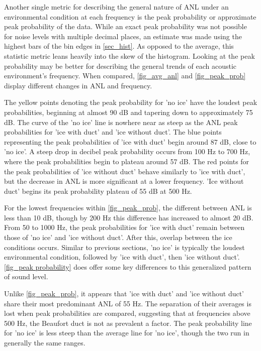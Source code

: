 Another single metric for describing the general nature of ANL under an environmental condition at each frequency is the peak probability or approximate peak probability of the data. While an exact peak probability was not possible for noise levels with multiple decimal places, an estimate was made using the highest bars of the bin edges in \autoref{sec_hist}. As opposed to the average, this statistic metric leans heavily into the skew of the histogram. Looking at the peak probability may be better for describing the general trends of each acoustic environment's frequency. When compared, \autoref{fig_avg_anl} and \autoref{fig_peak_prob} display different changes in ANL and frequency. 

The yellow points denoting the peak probability for 'no ice' have the loudest peak probabilities, beginning at almost 90 dB and tapering down to approximately 75 dB. The curve of the 'no ice' line is nowhere near as steep as the ANL peak probabilities for 'ice with duct' and 'ice without duct'. The blue points representing the peak probabilities of 'ice with duct' begin around 87 dB, close to 'no ice'. A steep drop in decibel peak probability occurs from 100 Hz to 700 Hz, where the peak probabilities begin to plateau around 57 dB.  The red points for the peak probabilities of 'ice without duct' behave similarly to 'ice with duct', but the decrease in ANL is more significant at a lower frequency. 'Ice without duct' begins its peak probability plateau of 55 dB at 500 Hz.

For the lowest frequencies within \autoref{fig_peak_prob}, the different between ANL is less than 10 dB, though by 200 Hz this difference has increased to almost 20 dB. From 50 to 1000 Hz, the peak probabilities for 'ice with duct' remain between those of 'no ice' and 'ice without duct'. After this, overlap between the ice conditions occurs. Similar to previous sections, 'no ice' is typically the loudest environmental condition, followed by 'ice with duct', then 'ice without duct'. \autoref{fig_peak probability} does offer some key differences to this generalized pattern of sound level.

Unlike \autoref{fig_peak_prob}, it appears that 'ice with duct' and 'ice without duct' share their most predominant ANL of 55 Hz. The separation of their averages is lost when peak probabilities are compared, suggesting that at frequencies above 500 Hz, the Beaufort duct is not as prevalent a factor. The peak probability line for 'no ice' is less steep than the average line for 'no ice', though the two run in generally the same ranges. 

